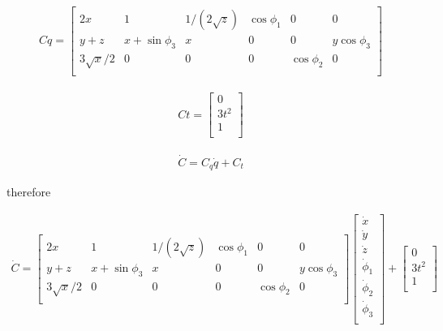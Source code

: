 \documentclass[letterpaper,10pt]{article} %
\begin{document}
\begin{eqnarray*}
	Cq = \begin{bmatrix} 
		2x &             1& 1/(2\sqrt{z})& \cos \phi_1&         0&           0\\
		y + z& x + \sin \phi_3&             x&         0&         0& y \cos \phi_3\\
		3\sqrt{x}/2&             0&             0&         0& \cos \phi_2&           0\\
	\end{bmatrix}
\end{eqnarray*}


\begin{eqnarray*}
	Ct = \begin{bmatrix} 
		0\\
		3t^2\\
		1\\
	\end{bmatrix}
\end{eqnarray*}


\begin{eqnarray*}
	\dot C =C_q \dot q +C_t
\end{eqnarray*}

therefore






\begin{eqnarray*}
	\dot C= \begin{bmatrix} 
		2x &             1& 1/(2\sqrt{z}) & \cos \phi_1&         0&           0\\
		y + z& x + \sin \phi_3&             x&         0&         0& y \cos \phi_3\\
		3\sqrt{x}/2&             0&             0&         0& \cos \phi_2&           0\\
	\end{bmatrix}
	\begin{bmatrix} 
		\dot x\\
		\dot y\\
		\dot z\\
		\dot \phi_1\\
		\dot \phi_2\\
		\dot \phi_3\\
	\end{bmatrix}
	+ \begin{bmatrix} 
		0\\
		3t^2\\
		1\\
	\end{bmatrix}
\end{eqnarray*}
\end{document}

